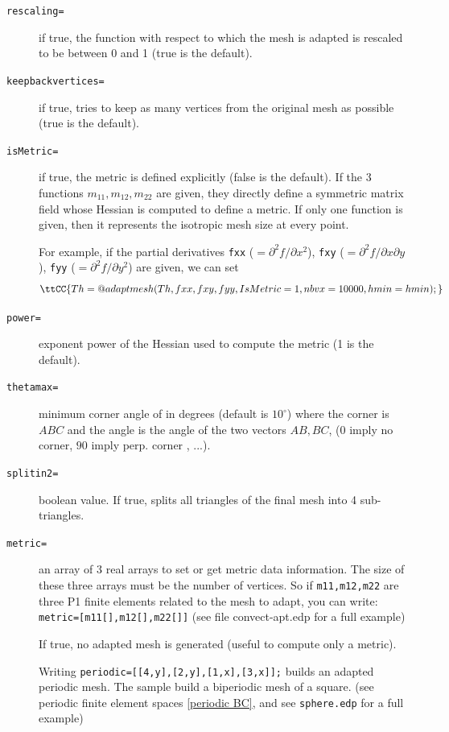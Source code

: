 \documentclass[a4paper,twoside,12pt]{book}
\def\p{\partial}
\begin{document}
\begin{description}
\item[\texttt{rescaling=}] if true, the function with respect to which the mesh is adapted is rescaled to be between 0
and 1 (true is the default).  

\item[\texttt{keepbackvertices=}] if true, tries to keep as many vertices from the original mesh as possible (true is
the default).  

\item[\texttt{isMetric=}] if true, the metric is defined explicitly (false is the default).  If the 3 functions $m_{11},
m_{12}, m_{22}$ are given, they directly define a symmetric matrix field whose Hessian is computed to define a
metric. If only one function is given, then it represents the isotropic mesh size at every point.

For example, if the partial derivatives \texttt{fxx} ($=\p^2 f/\p x^2$), \texttt{fxy} ($=\p^2 f/\p x\p y$), \texttt{fyy}
($=\p^2 f/\p y^2$) are given, we can set
$$
\ttCC{Th=@adaptmesh(Th,fxx,fxy,fyy,IsMetric=1,nbvx=10000,hmin=hmin);}
$$

\item[\texttt{power=}] exponent power of the Hessian used to compute the metric (1 is the default).

\item[\texttt{thetamax=}] minimum corner angle of in degrees (default is $10^\circ$) where the corner is $ABC$ and the
angle is the angle of the two vectors ${AB}, {BC}$, ($0$ imply no corner, $90$ imply perp. corner , ...).

\item[\texttt{splitin2=}] boolean value. If true, splits all triangles of the final mesh into 4
sub-triangles. 

\item[\texttt{metric=}]  an array of 3 real arrays to set or get metric data information. The
size of these three arrays must be the number of vertices. So if \texttt{m11,m12,m22} are three P1 finite elements
related to the mesh to adapt, you can write: \texttt{metric=[m11[],m12[],m22[]]} (see file convect-apt.edp for a full
example)

\itemtt[nomeshgeneration=]  If true, no adapted mesh is generated (useful to compute
only a metric).

\itemtt[periodic=]  %
Writing \texttt{periodic=[[4,y],[2,y],[1,x],[3,x]];}
builds an adapted periodic mesh. The sample
build a biperiodic mesh of a square.
(see periodic finite element   spaces \ref{periodic BC}, and see \texttt{sphere.edp} for a  full example)

\end{description}
\end{document}

